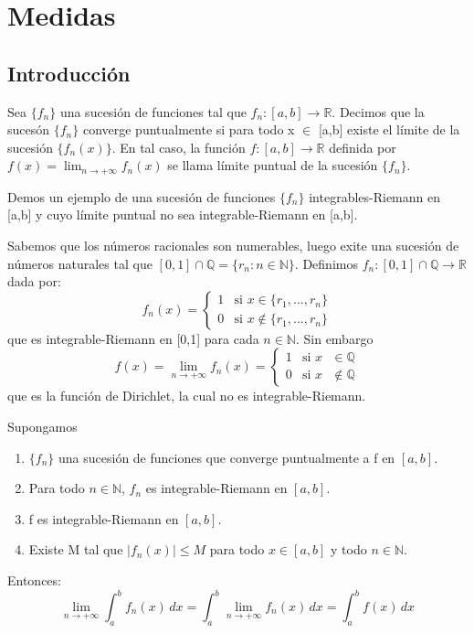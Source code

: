 \chapter{Medidas}
\section{Introducción}

\begin{defi}
    Sea $\{f_n\}$ una sucesión de funciones tal que $f_n:[a,b] \longrightarrow \mathbb{R}$. Decimos que la sucesón $\{f_n\}$ converge puntualmente si para todo x $\in$ [a,b] existe el límite de la sucesión $\{f_n(x)\}$. En tal caso, la función  $f:[a,b]\longrightarrow\mathbb{R}$ definida por $f(x) = \displaystyle\lim_{n \to{+}\infty}{f_n(x)}$ se llama límite puntual de la sucesión $\{f_n\}$.
\end{defi}

\begin{ejemplo}
    Demos un ejemplo de una sucesión de funciones $\{f_n\}$ integrables-Riemann en [a,b] y cuyo límite puntual no sea integrable-Riemann en [a,b].
\end{ejemplo}
Sabemos que los números racionales son numerables, luego exite una sucesión de números naturales tal que $[0,1]\cap\mathbb{Q} = \{ r_n : n\in\mathbb{N}\}$.
Definimos $f_n:[0,1] \cap \mathbb{Q} \longrightarrow \mathbb{R}$ dada por:
$$
    f_n(x) = \left\{ \begin{matrix} 1 & \text{si } x \in \{r_1, ...,r_n\}     \\
               0 & \text{si } x \not\in \{r_1, ...,r_n\}
    \end{matrix}\right.
$$
que es integrable-Riemann en [0,1] para cada $n\in\mathbb{N}$. Sin embargo
$$
    f(x) = \displaystyle\lim_{n \to{+}\infty}{f_n(x)} = \left\{ \begin{matrix} 1 & \mbox{si }x\mbox{ $\in\mathbb{Q}$}
               \\ 0 & \mbox{si }x\mbox{ $\not\in\mathbb{Q}$}\end{matrix}\right.
$$
que es la función de Dirichlet, la cual no es integrable-Riemann.

\begin{teo}
    Supongamos
    \begin{enumerate}
        \item $\{f_n\}$ una sucesión de funciones que converge puntualmente a f en $[a,b]$.
        \item Para todo $n \in \mathbb{N}$, $f_n$ es integrable-Riemann en $[a,b]$.
        \item f es integrable-Riemann en $[a,b]$.
        \item Existe M tal que $|f_n(x)| \leq M$ para todo $x \in [a,b]$ y todo $n \in \mathbb{N}$.
    \end{enumerate}
    Entonces:
    $$
        \lim_{n \to{+}\infty}{\int_{a}^{b} f_n(x)\, dx} = \int_{a}^{b} \lim_{n \to{+}\infty}{f_n(x)} \, dx = \int_{a}^{b} f(x)\, dx
    $$
\end{teo}

